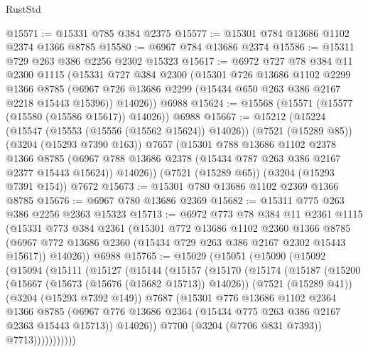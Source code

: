 \begin{lexlean}{RustStd}
\begin{coremodule}
@15571 := @15331 @785 @384 @2375
@15577 := @15301 @784 @13686 @1102 @2374 @1366 @8785
@15580 := @6967 @784 @13686 @2374
@15586 := @15311 @729 @263 @386 @2256 @2302 @15323
@15617 := @6972
    @727
    @78
    @384
    @11
    @2300
    @1115
    (@15331
      @727
      @384
      @2300
      (@15301
        @726
        @13686
        @1102
        @2299
        @1366
        @8785
        (@6967 @726 @13686 @2299 (@15434 @650 @263 @386 @2167 @2218 @15443 @15396))
        @14026))
    @6988
@15624 := @15568 (@15571 (@15577 (@15580 (@15586 @15617)) @14026)) @6988
@15667 := @15212
    (@15224
      (@15547 (@15553 (@15556 (@15562 @15624)) @14026))
      (@7521 (@15289 @85))
      (@3204 (@15293 @7390 @163))
      @7657
      (@15301
        @788
        @13686
        @1102
        @2378
        @1366
        @8785
        (@6967 @788 @13686 @2378 (@15434 @787 @263 @386 @2167 @2377 @15443 @15624))
        @14026))
    (@7521 (@15289 @65))
    (@3204 (@15293 @7391 @154))
    @7672
@15673 := @15301 @780 @13686 @1102 @2369 @1366 @8785
@15676 := @6967 @780 @13686 @2369
@15682 := @15311 @775 @263 @386 @2256 @2363 @15323
@15713 := @6972
    @773
    @78
    @384
    @11
    @2361
    @1115
    (@15331
      @773
      @384
      @2361
      (@15301
        @772
        @13686
        @1102
        @2360
        @1366
        @8785
        (@6967 @772 @13686 @2360 (@15434 @729 @263 @386 @2167 @2302 @15443 @15617))
        @14026))
    @6988
@15765 := @15029
    (@15051
      (@15090
        (@15092
          (@15094
            (@15111
              (@15127
                (@15144
                  (@15157
                    (@15170
                      (@15174
                        (@15187
                          (@15200
                            (@15667 (@15673 (@15676 (@15682 @15713)) @14026))
                            (@7521 (@15289 @41))
                            (@3204 (@15293 @7392 @149))
                            @7687
                            (@15301
                              @776
                              @13686
                              @1102
                              @2364
                              @1366
                              @8785
                              (@6967
                                @776
                                @13686
                                @2364
                                (@15434 @775 @263 @386 @2167 @2363 @15443 @15713))
                              @14026))
                          @7700
                          (@3204 (@7706 @831 @7393))
                          @7713)))))))))))

\end{coremodule}
\end{lexlean}
